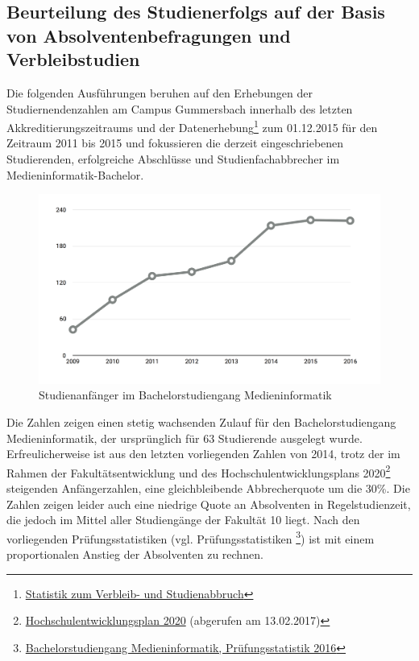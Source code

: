 \subsection{Beurteilung des Studienerfolgs auf der Basis von
Absolventenbefragungen und
Verbleibstudien}\label{beurteilung-des-studienerfolgs-auf-der-basis-von-absolventenbefragungen-und-verbleibstudien}

Die folgenden Ausführungen beruhen auf den Erhebungen der
Studiernendenzahlen am Campus Gummersbach innerhalb des letzten
Akkreditierungszeitraums und der Datenerhebung\footnote{\href{../anhaenge/verbleib-und-studienabbruch.pdf}{Statistik
  zum Verbleib- und Studienabbruch}} zum 01.12.2015 für den Zeitraum
2011 bis 2015 und fokussieren die derzeit eingeschriebenen Studierenden,
erfolgreiche Abschlüsse und Studienfachabbrecher im
Medieninformatik-Bachelor.

\begin{figure}[htbp][htbp]
\centering
\includegraphics[width=\columnwidth]{../anhaenge/bilder/ba-anfaengerzahlen.png}
\caption{Studienanfänger im Bachelorstudiengang Medieninformatik}
\end{figure}

Die Zahlen zeigen einen stetig wachsenden Zulauf für den
Bachelorstudiengang Medieninformatik, der ursprünglich für 63
Studierende ausgelegt wurde. Erfreulicherweise ist aus den letzten
vorliegenden Zahlen von 2014, trotz der im Rahmen der
Fakultätsentwicklung und des Hochschulentwicklungsplans 2020\footnote{\href{https://www.verwaltung.th-koeln.de/imperia/md/content/verwaltung/broschueren_leitfaeden/hochschulentwicklungsplan2020.pdf}{Hochschulentwicklungsplan
  2020} (abgerufen am 13.02.2017)} steigenden Anfängerzahlen, eine
gleichbleibende Abbrecherquote um die 30\%. Die Zahlen zeigen leider
auch eine niedrige Quote an Absolventen in Regelstudienzeit, die jedoch
im Mittel aller Studiengänge der Fakultät 10 liegt. Nach den
vorliegenden Prüfungsstatistiken (vgl. Prüfungsstatistiken \footnote{\href{../anhaenge/pruefungsstatistiken.pdf}{Bachelorstudiengang
  Medieninformatik, Prüfungsstatistik 2016}}) ist mit einem
proportionalen Anstieg der Absolventen zu rechnen.


